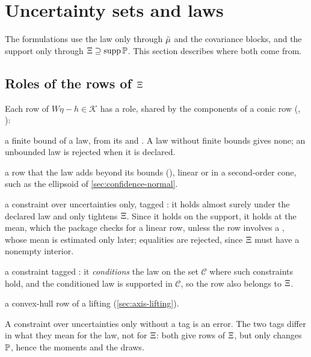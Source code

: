 \section{Uncertainty sets and laws}
\label{sec:laws}

The formulations use the law only through $\bar\mu$ and the covariance blocks, and the support only through $\Xi \supseteq \operatorname{supp}\mathbb{P}$.
This section describes where both come from.

\subsection{Roles of the rows of \texorpdfstring{$\Xi$}{the support}}

Each row of $W\eta - h \in \mathcal{K}$ has a role, shared by the components of a conic row (, ):
\begin{description}[nosep,font=\normalfont\ttfamily]
\item[:box] a finite bound of a law, from its  and .
A law without finite bounds gives none; an unbounded law is rejected when it is declared.
\item[:law] a row that the law adds beyond its bounds (),
linear or in a second-order cone, such as the ellipsoid of \cref{sec:confidence-normal}.
\item[:valid] a constraint over uncertainties only, tagged :
it holds almost surely under the declared law and only tightens $\Xi$.
Since it holds on the support, it holds at the mean, which the package checks for a linear row,
unless the row involves a , whose mean is estimated only later;
equalities are rejected, since $\Xi$ must have a nonempty interior.
\item[:truncate] a constraint tagged :
it \emph{conditions} the law on the set $\mathcal{C}$ where such constraints hold,
and the conditioned law is supported in $\mathcal{C}$, so the row also belongs to $\Xi$.
\item[:hull] a convex-hull row of a lifting (\cref{sec:axis-lifting}).
\end{description}
A constraint over uncertainties only without a tag is an error.
The two tags differ in what they mean for the law, not for $\Xi$:
both give rows of $\Xi$, but only  changes $\mathbb{P}$,
hence the moments and the draws.

